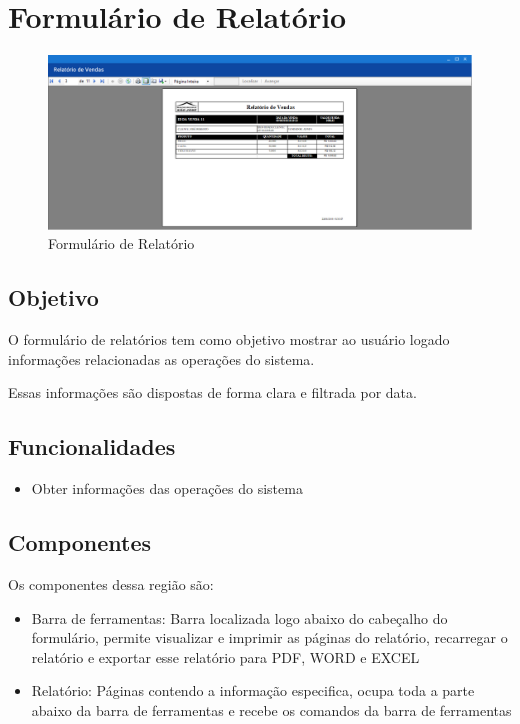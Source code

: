 \documentclass[
	article,			%
	12pt,				%
	oneside,			%
	a4paper,			%
	english,			%
	brazil,				%
	sumario=tradicional
	]{abntex2}
\begin{document}
	\section{Formulário de Relatório}
		\begin{figure}[!htb]
			\centering
			\includegraphics[scale=0.4]{./Figuras/FrmRelatorio.png}
			\caption{Formulário de Relatório}
		\end{figure}
		\subsection{Objetivo}
		O formulário de relatórios tem como objetivo mostrar ao usuário logado informações relacionadas as operações do sistema.
		
		Essas informações são dispostas de forma clara e filtrada por data.
		\subsection{Funcionalidades}
		\begin{itemize}
			\item Obter informações das operações do sistema
		\end{itemize}
		\subsection{Componentes}
		Os componentes dessa região são:
		\begin{itemize}\itemsep1.5pt	
			\item Barra de ferramentas: Barra localizada logo abaixo do cabeçalho do formulário, permite visualizar e imprimir as páginas do relatório, recarregar o relatório e exportar esse relatório para PDF, WORD e EXCEL
			\item Relatório: Páginas contendo a informação especifica, ocupa toda a parte abaixo da barra de ferramentas e recebe os comandos da barra de ferramentas
		\end{itemize}
\end{document}
